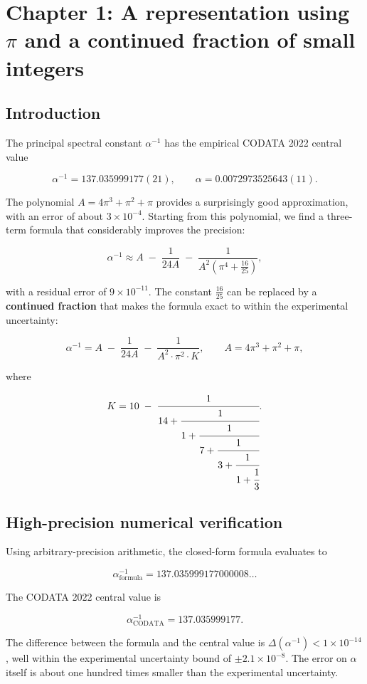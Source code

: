 \documentclass[12pt]{article}
\numberwithin{equation}{section}
\begin{document}
\newpage

\section{Chapter 1: A representation using $\pi$ and a continued fraction of small integers}

\subsection{Introduction}

The principal spectral constant \(\alpha^{-1}\) has the empirical CODATA 2022 central value

\[
\alpha^{-1} = 137.035999177(21), \qquad \alpha = 0.0072973525643(11).
\]

The polynomial \(A = 4\pi^3 + \pi^2 + \pi\) provides a surprisingly good approximation, with an error of about \(3\times10^{-4}\). Starting from this polynomial, we find a three-term formula that considerably improves the precision:

\[
\alpha^{-1} \approx A \;-\; \frac{1}{24A} \;-\; \frac{1}{A^2\left(\pi^4 + \frac{16}{25}\right)},
\]

with a residual error of \(9\times10^{-11}\). The constant \(\frac{16}{25}\) can be replaced by a \textbf{continued fraction} that makes the formula exact to within the experimental uncertainty:

\[
\boxed{
\alpha^{-1} = A \;-\; \frac{1}{24A} \;-\; \frac{1}{A^2 \cdot \pi^2 \cdot K}, \qquad A = 4\pi^3 + \pi^2 + \pi,
}
\]

where

\[
K = 10 \;-\; \cfrac{1}{14 + \cfrac{1}{1 + \cfrac{1}{7 + \cfrac{1}{3 + \cfrac{1}{1 + \cfrac{1}{3}}}}}}.
\]

\subsection{High-precision numerical verification}

Using arbitrary-precision arithmetic, the closed-form formula evaluates to

\[
\alpha^{-1}_{\text{formula}} = 137.035999177000008\ldots
\]

The CODATA 2022 central value is

\[
\alpha^{-1}_{\text{CODATA}} = 137.035999177.
\]

The difference between the formula and the central value is \(\Delta(\alpha^{-1}) < 1\times10^{-14}\), well within the experimental uncertainty bound of \(\pm 2.1\times10^{-8}\). The error on \(\alpha\) itself is about one hundred times smaller than the experimental uncertainty.
\end{document}
